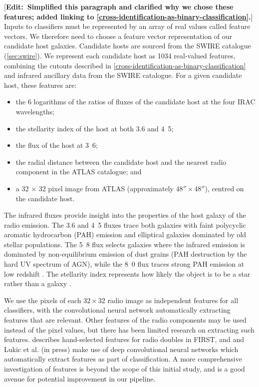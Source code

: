 \documentclass[fleqn,usenatbib,usedcolumn]{mnras}
\newcommand{\edit}[1]{ {\color{red}[{\bf Edit:~{#1}}]} }
\begin{document}
    \edit{Simplified this paragraph and clarified why we chose these features; added linking to \autoref{cross-identification-as-binary-classification}.} Inputs to classifiers must be represented by an array of real values called feature vectors. We therefore need to choose a feature vector representation of our candidate host galaxies. Candidate hosts are sourced from the SWIRE catalogue (\autoref{sec:swire}). We represent each candidate host as 1034 real-valued features, combining the cutouts described in \autoref{cross-identification-as-binary-classification} and infrared ancillary data from the SWIRE catalogue. For a given candidate host, these features are:
    \begin{itemize}
      \item the 6 logarithms of the ratios of fluxes of the candidate
        host at the four IRAC wavelengths;
      \item the stellarity index of the host at both 3.6 and
        \unit{4.5}{\micro\meter};
      \item the flux of the host at \unit{3.6}{\micro\meter};
      \item the radial distance between the candidate host and the nearest
        radio component in the ATLAS catalogue; and
      \item a 32 $\times$ 32 pixel image from ATLAS (approximately $48''
        \times 48''$), centred on the candidate host.
    \end{itemize}

    The infrared fluxes provide insight into the properties of the host galaxy of the radio emission. The 3.6 and \unit{4.5}{\micro\meter} fluxes trace both galaxies with faint polycyclic aromatic hydrocarbon (PAH) emission and elliptical galaxies dominated by old stellar populations. The \unit{5.8}{\micro\meter} flux selects galaxies where the infrared emission is dominated by non-equilibrium emission of dust grains (PAH destruction
    by the hard UV spectrum of AGN), while the \unit{8.0}{\micro\meter} flux traces strong PAH emission at low redshift \citep{Sajina2005}. The stellarity index represents how likely the object is to be a star rather than a galaxy \citep{surace05swire}.

    We use the pixels of each $32 \times 32$ radio image as independent features for all classifiers, with the convolutional neural network
    automatically extracting features that are relevant. Other features of the radio components may be used instead of the pixel values, but there has been limited research on extracting such features. \citet{proctor06} describes hand-selected features for radio doubles in FIRST, and \citet{aniyan17cnn} and Lukic et al. (in press) make use of deep convolutional neural networks which automatically extract features as part of classification. A more comprehensive investigation of features is beyond the scope of this initial study, and is a good avenue for potential improvement in our pipeline.
\end{document}
